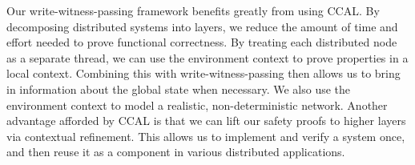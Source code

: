Our write-witness-passing framework benefits greatly from using CCAL.
By decomposing distributed systems into layers, we reduce the amount of time and effort needed to
prove functional correctness.
By treating each distributed node as a separate thread, we can use the environment context to
prove properties in a local context.
Combining this with write-witness-passing then allows us to bring in information about the global state when necessary.
We also use the environment context to model a realistic, non-deterministic network.
Another advantage afforded by CCAL is that we can lift our safety proofs to higher layers via contextual refinement.
This allows us to implement and verify a system once, and then reuse it as a component in various distributed applications.



